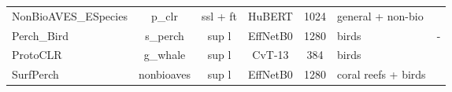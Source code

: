 \begin{table*}[t]
\begin{tabular}{|l|c|c|c|c|l|c|}
    NonBioAVES\_ESpecies & p\_clr    & ssl + ft & HuBERT 	 & 1024& general + non-bio & \cite{hagiwara_aves_2022}\\
    Perch\_Bird         & s\_perch   & sup l & EffNetB0 	 & 1280& birds & - \\
    ProtoCLR            & g\_whale   & sup l 	 & CvT-13 & 384 & birds & \cite{moummad_domain-invariant_2024}\\
    SurfPerch           & nonbioaves   & sup l & EffNetB0 	 & 1280& coral reefs + birds & \cite{williams_leveraging_2024}\\
    \hline
  \end{tabular}
\end{table*}
